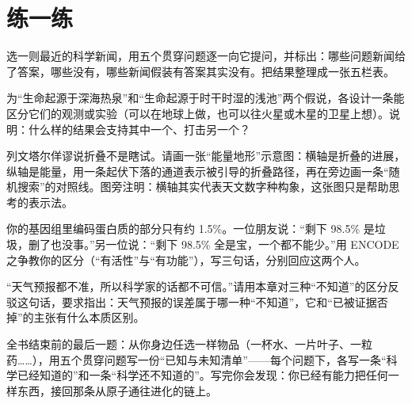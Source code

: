 \section*{练一练}

\begin{sikaoti}
\item 选一则最近的科学新闻，用五个贯穿问题逐一向它提问，并标出：哪些问题新闻给了答案，哪些没有，哪些新闻假装有答案其实没有。把结果整理成一张五栏表。
\item 为“生命起源于深海热泉”和“生命起源于时干时湿的浅池”两个假说，各设计一条能区分它们的观测或实验（可以在地球上做，也可以往火星或木星的卫星上想）。说明：什么样的结果会支持其中一个、打击另一个？
\item 列文塔尔佯谬说折叠不是瞎试。请画一张“能量地形”示意图：横轴是折叠的进展，纵轴是能量，用一条起伏下落的通道表示被引导的折叠路径，再在旁边画一条“随机搜索”的对照线。图旁注明：横轴其实代表天文数字种构象，这张图只是帮助思考的表示法。
\item 你的基因组里编码蛋白质的部分只有约 1.5\%。一位朋友说：“剩下 98.5\% 是垃圾，删了也没事。”另一位说：“剩下 98.5\% 全是宝，一个都不能少。”用 ENCODE 之争教你的区分（“有活性”与“有功能”），写三句话，分别回应这两个人。
\item “天气预报都不准，所以科学家的话都不可信。”请用本章对三种“不知道”的区分反驳这句话，要求指出：天气预报的误差属于哪一种“不知道”，它和“已被证据否掉”的主张有什么本质区别。
\item 全书结束前的最后一题：从你身边任选一样物品（一杯水、一片叶子、一粒药……），用五个贯穿问题写一份“已知与未知清单”——每个问题下，各写一条“科学已经知道的”和一条“科学还不知道的”。写完你会发现：你已经有能力把任何一样东西，接回那条从原子通往进化的链上。
\end{sikaoti}
